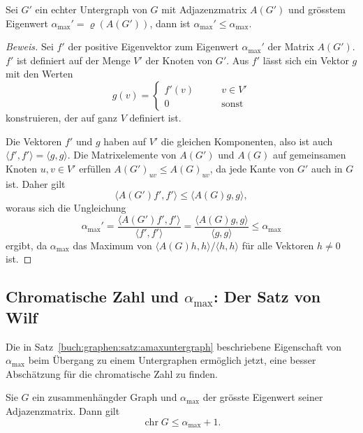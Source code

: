 \begin{satz}
\label{buch:graphen:satz:amaxuntergraph}
Sei $G'$ ein echter Untergraph von $G$ mit Adjazenzmatrix $A(G')$ und
grösstem Eigenwert $\alpha_{\text{max}}'=\varrho(A(G'))$, dann ist
$\alpha_{\text{max}}' \le \alpha_{\text{max}}$.
\end{satz}

\begin{proof}[Beweis]
Sei $f'$ der positive Eigenvektor zum Eigenwert $\alpha_{\text{max}}'$
der Matrix $A(G')$.
$f'$ ist definiert auf der Menge $V'$ der Knoten von $G'$.
Aus $f'$ lässt sich ein Vektor $g$ mit den Werten
\[
g(v)
=
\begin{cases}
f'(v)&\qquad v\in V'\\
    0&\qquad\text{sonst}
\end{cases}
\]
konstruieren, der auf ganz $V$ definiert ist.

Die Vektoren $f'$ und $g$ haben auf $V'$ die gleichen Komponenten, also ist auch
$\langle f',f'\rangle = \langle g,g\rangle$.
Die Matrixelemente von $A(G')$ und $A(G)$ auf gemeinsamen Knoten $u,v\in V'$ 
erfüllen $A(G')_{uv}\le A(G)_{uv}$, da jede Kante von $G'$ auch in $G$ ist.
Daher gilt
\[
\langle A(G')f',f'\rangle
\le
\langle A(G)g,g\rangle,
\]
woraus sich die Ungleichung
\[
\alpha_{\text{max}}'
=
\frac{\langle A(G')f',f'\rangle}{\langle f',f'\rangle}
=
\frac{\langle A(G)g,g\rangle}{\langle g,g\rangle}
\le
\alpha_{\text{max}}
\]
ergibt, da $\alpha_{\text{max}}$ das Maximum von
$\langle A(G)h,h\rangle/\langle h,h\rangle$ für alle Vektoren $h\ne 0$ ist.
\end{proof}

%
%
\subsection{Chromatische Zahl und $\alpha_{\text{max}}$: Der Satz von Wilf
\label{buch:subsection:chr-und-alpha-max}}
%
%
Die in Satz~\ref{buch:graphen:satz:amaxuntergraph} beschriebene
Eigenschaft von $\alpha_{\text{max}}$ beim Übergang zu einem Untergraphen
ermöglich jetzt, eine besser Abschätzung für die chromatische Zahl
zu finden.

\begin{satz}[Wilf]
\label{buch:graphen:satz:wilf}
Sie $G$ ein zusammenhängder Graph und $\alpha_{\text{max}}$ der grösste
Eigenwert seiner Adjazenzmatrix. Dann gilt
\[
\operatorname{chr}G\le \alpha_{\text{max}}+1.
\]
\end{satz}

